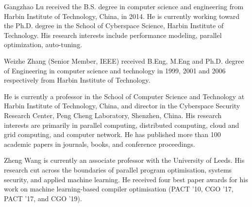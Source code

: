 \documentclass[journal,compsoc,10pt,final]{IEEEtran}
\begin{document}


\begin{IEEEbiography}{Gangzhao Lu}
 received the B.S. degree in computer science and engineering from Harbin Institute of Technology, China, in 2014. He is currently working toward the Ph.D. degree in the School of Cyberspace Science, Harbin Institute of Technology. His research interests include performance modeling, parallel optimization, auto-tuning. 
\end{IEEEbiography}
\begin{IEEEbiography}{Weizhe Zhang} (Senior Member, IEEE) received B.Eng, M.Eng and Ph.D. degree of Engineering in computer science and technology in 1999, 2001 and 2006 respectively from Harbin Institute of Technology.

He is currently a professor in the School of Computer Science and Technology at Harbin Institute of Technology, China, and director in the Cyberspace Security Research Center, Peng Cheng Laboratory, Shenzhen, China. His research interests are primarily in parallel computing, distributed computing, cloud and grid computing, and computer network. He has published more than 100 academic papers in journals, books, and conference proceedings. 
\end{IEEEbiography}
\begin{IEEEbiography}{Zheng Wang} is currently an associate professor with the University of Leeds. His research cut across the boundaries of parallel program optimisation, systems security, and applied machine learning. He received four best paper awards for his work on machine learning-based compiler optimisation (PACT ’10, CGO ’17, PACT ’17, and CGO ’19). 
\end{IEEEbiography}
\end{document}

